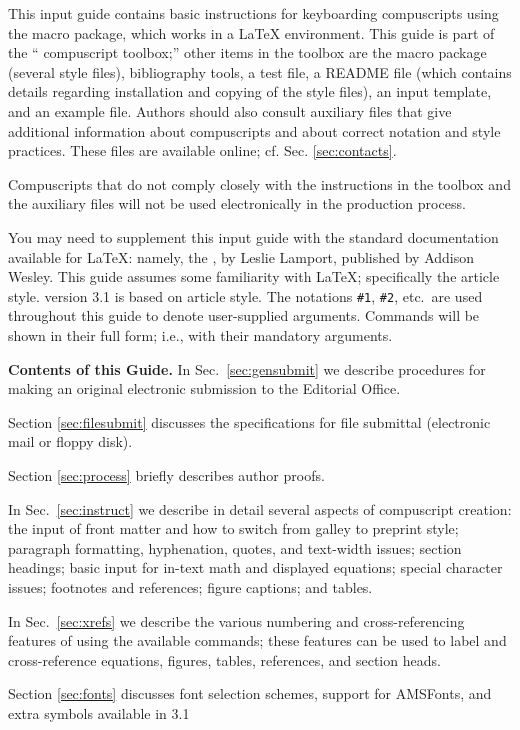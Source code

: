 This input guide contains basic instructions for keyboarding compuscripts
using the \REVTeX{} macro package, which works in a \LaTeX{} environment.
This guide is part of the ``\REVTeX{} compuscript toolbox;'' other items in
the toolbox are the \REVTeX{} macro package (several style files),
bibliography tools, a test file, a README file (which contains details
regarding installation and copying of the style files), an input
template, and an example file. Authors should also consult auxiliary
files that give additional information about compuscripts and about
correct notation and style practices. These files are available
online; cf. Sec. \ref{sec:contacts}. 

Compuscripts that do not comply closely with the instructions in the
toolbox and the auxiliary files will not be
used electronically in the production process.

You may need to supplement this input guide with the standard documentation
available for \LaTeX: namely, the \LUG{}, by Leslie Lamport, published by
Addison Wesley. This guide assumes some familiarity with \LaTeX;
specifically the article style. \REVTeX{} version 3.1 is based on article
style. The notations \verb+#1+, \verb+#2+, etc.\ are used throughout this
guide to denote user-supplied arguments. Commands will be shown in their
full form; i.e., with their mandatory arguments.

{\bf Contents of this Guide.} In Sec.\ \ref{sec:gensubmit} we describe
procedures for making an original electronic submission to the
Editorial Office.

Section \ref{sec:filesubmit} discusses the specifications for file
submittal (electronic mail or floppy disk).

Section \ref{sec:process}  briefly describes author proofs.

In Sec.\ \ref{sec:instruct} we describe in detail several aspects of
compuscript creation: the input of front matter and how to switch from
galley to preprint style; paragraph formatting, hyphenation, quotes, and
text-width issues; section headings; basic input for in-text math and
displayed equations; special character issues; footnotes and
references; figure captions; and tables.

In Sec.\ \ref{sec:xrefs} we describe the various numbering and
cross-referencing features of \REVTeX{} using the available commands; these
features can be used to label and cross-reference equations, figures,
tables, references, and section heads.

Section \ref{sec:fonts} discusses font selection schemes, support for
AMSFonts, and extra symbols available in \REVTeX{} 3.1

